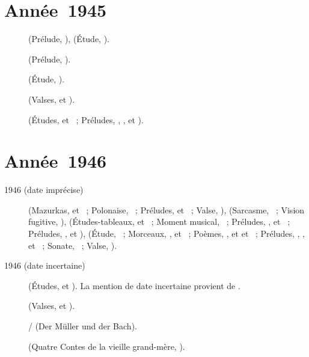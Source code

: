 \section{Année~1945}

\begin{description}
 \item[]
 \Rachmaninov{} (Prélude,  ), \Scriabine{} (Étude,
  ).
 \item[]
 \Rachmaninov{} (Prélude,  ).
 \item[]
 \Scriabine{} (Étude,  ).
 \item[]
 \Chopin{} (Valses,   et  ).
 \item[]
 \Scriabine{} (Études,   et ~; Préludes,
  ,  ,   et
  ).
\end{description}

\section{Année~1946}

\begin{description}
 \item[1946 (date imprécise)]
 \Chopin{} (Mazurkas,   et  ~;
 Polonaise,  ~; Préludes,   et
 ~; Valse,  ), \Prokofiev{} (Sarcasme,
  ~; Vision fugitive,  ),
 \Rachmaninov{} (Études-tableaux,   et 
 ~; Moment musical,  ~; Préludes, 
 ,  et ~; Préludes,  ,
  et ), \Scriabine{} (Étude,  ~;
 Morceaux,  ,   et 
 ~; Poèmes,  ,  et 
  et ~; Préludes,  , 
 ,   et  ~; Sonate,
 ~; Valse, ).
 \item[1946 (date incertaine)]
 \Scriabine{} (Études,   et ).
 La mention de date incertaine provient de \citet[vol.~10]{Nikonovich79}.
 \item[]
 \Chopin{} (Valses,   et  ).
 \item[]
 \Schubert{}/\Liszt{} (Der Müller und der Bach).
 \item[]
 \Prokofiev{} (Quatre Contes de la vieille grand-mère, ).
\end{description}

